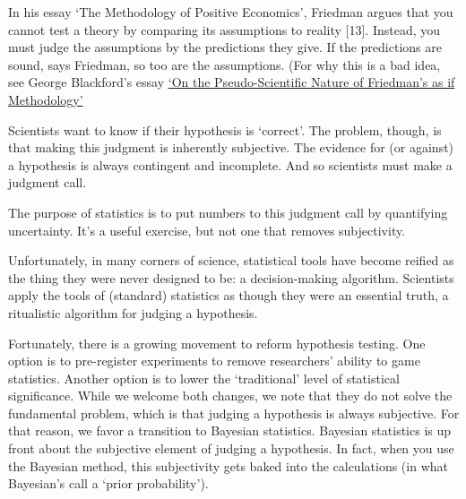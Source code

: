 \documentclass[
]{book}
\begin{document}
In his essay `The Methodology of Positive Economics', Friedman argues that you cannot test a theory by comparing its assumptions to reality {[}13{]}. Instead, you must judge the assumptions by the predictions they give. If the predictions are sound, says Friedman, so too are the assumptions. (For why this is a bad idea, see George Blackford's essay
\href{https://www.rweconomics.com/BPA.htm}{`On the Pseudo-Scientific Nature of Friedman's as if Methodology'}

Scientists want to know if their hypothesis is `correct'. The problem, though, is that making this judgment is inherently subjective. The evidence for (or against) a hypothesis is always contingent and incomplete. And so scientists must make a judgment call.

The purpose of statistics is to put numbers to this judgment call by quantifying uncertainty. It's a useful exercise, but not one that removes subjectivity.

Unfortunately, in many corners of science, statistical tools have become reified as the thing they were never designed to be: a decision-making algorithm. Scientists apply the tools of (standard) statistics as though they were an essential truth, a ritualistic algorithm for judging a hypothesis.

Fortunately, there is a growing movement to reform hypothesis testing. One option is to pre-register experiments to remove researchers' ability to game statistics. Another option is to lower the `traditional' level of statistical significance.
While we welcome both changes, we note that they do not solve the fundamental problem, which is that judging a hypothesis is always subjective.
For that reason, we favor a transition to Bayesian statistics.
Bayesian statistics is up front about the subjective element of judging a hypothesis. In fact, when you use the Bayesian method, this subjectivity gets baked into the calculations (in what Bayesian's call a `prior probability').
\end{document}
